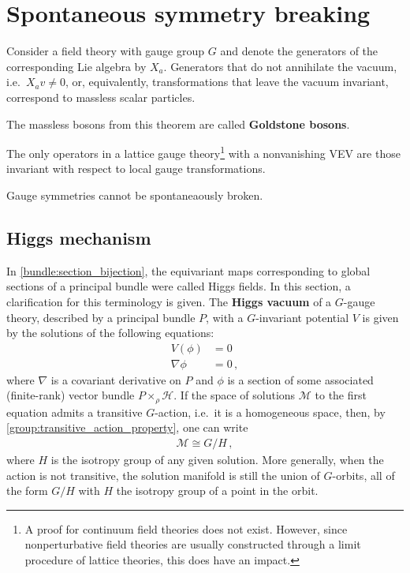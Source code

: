 
\section{Spontaneous symmetry breaking}

    \begin{theorem}[Goldstone]
        Consider a field theory with gauge group $G$ and denote the generators of the corresponding Lie algebra by $X_a$. Generators that do not annihilate the vacuum, i.e.~$X_av\neq0$, or, equivalently, transformations that leave the vacuum invariant, correspond to massless scalar particles.
    \end{theorem}
    The massless bosons from this theorem are called \textbf{Goldstone bosons}.

    \begin{theorem}[Elitzur]\label{gauge:elitzur}
        The only operators in a lattice gauge theory\footnote{A proof for continuum field theories does not exist. However, since nonperturbative field theories are usually constructed through a limit procedure of lattice theories, this does have an impact.} with a nonvanishing VEV are those invariant with respect to local gauge transformations.
    \end{theorem}
    \begin{result}
        Gauge symmetries cannot be spontaneaously broken.
    \end{result}

\subsection{Higgs mechanism}\label{section:higgs_mechanism}

    In \cref{bundle:section_bijection}, the equivariant maps corresponding to global sections of a principal bundle were called Higgs fields. In this section, a clarification for this terminology is given. The \textbf{Higgs vacuum} of a $G$-gauge theory, described by a principal bundle $P$, with a $G$-invariant potential $V$ is given by the solutions of the following equations:
    \begin{align}
        V(\phi) &= 0\\
        \nabla\phi &= 0\,,
    \end{align}
    where $\nabla$ is a covariant derivative on $P$ and $\phi$ is a section of some associated (finite-rank) vector bundle $P\times_\rho\mathcal{H}$. If the space of solutions $\mathcal{M}$ to the first equation admits a transitive $G$-action, i.e.~it is a homogeneous space, then, by \cref{group:transitive_action_property}, one can write
    \begin{gather}
        \mathcal{M}\cong G/H\,,
    \end{gather}
    where $H$ is the isotropy group of any given solution. More generally, when the action is not transitive, the solution manifold is still the union of $G$-orbits, all of the form $G/H$ with $H$ the isotropy group of a point in the orbit.

